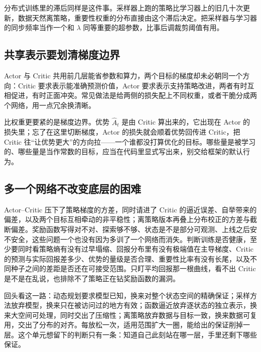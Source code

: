 分布式训练里的滞后同样是这件事。采样器上跑的策略比学习器上的旧几十次更新，数据天然离策略，重要性权重的分布直接由这个滞后决定。把采样器与学习器的同步频率当作一个和 \(\lambda\) 同等重要的超参数，比事后调裁剪阈值有用。

\subsection{共享表示要划清梯度边界}

Actor 与 Critic 共用前几层能省参数和算力，两个目标的梯度却未必朝同一个方向：Critic 要求表示能准确预测价值，Actor 要求表示支持策略改进，两者有时互相促进，有时正面冲突。常见做法是给两侧的损失配上不同权重，或者干脆分成两个网络，用一点冗余换清晰。

比权重更要紧的是梯度边界。优势 \(\widehat A_t\) 是由 Critic 算出来的，它出现在 Actor 的损失里；忘了在这里切断梯度，Actor 的损失就会顺着优势回传进 Critic，把 Critic 往``让优势更大''的方向拉——一个谁都没打算优化的目标。哪些量是被学习的、哪些量是当作常数的目标，应当在代码里显式写出来，别交给框架的默认行为。

\subsection{多一个网络不改变底层的困难}

Actor--Critic 压下了策略梯度的方差，同时请进了 Critic 的逼近误差、自举带来的偏差，以及两个目标互相牵动的非平稳性；离策略版本再叠上分布校正的方差与截断偏差。奖励函数写得对不对、探索够不够、状态是不是部分可观测、上线之后安不安全，这些问题一个也没有因为多训了一个网络而消失。判断训练是否健康，至少要同时看策略熵有没有过早塌缩、回报分布里有没有极端值在主导梯度、Critic 的预测与实际回报差多少、优势的量级是否合理、重要性比率有没有长尾，以及不同种子之间的差距是否还在可接受范围。只盯平均回报那一根曲线，看不出 Critic 是不是在乱说，也排除不了策略正在钻奖励函数的漏洞。

回头看这一路：动态规划要求模型已知，换来对整个状态空间的精确保证；采样方法放弃模型，换来只在被访问过的地方有效；函数逼近放弃逐状态的独立表示，换来大空间可处理，同时交出了压缩性；离策略放弃数据与目标一致，换来数据可复用，交出了分布的对齐。每放松一次，适用范围扩大一圈，能给出的保证削掉一层。这个单元想留下的判断只有一条：知道自己此刻站在哪一层，手里还剩下哪些保证。
